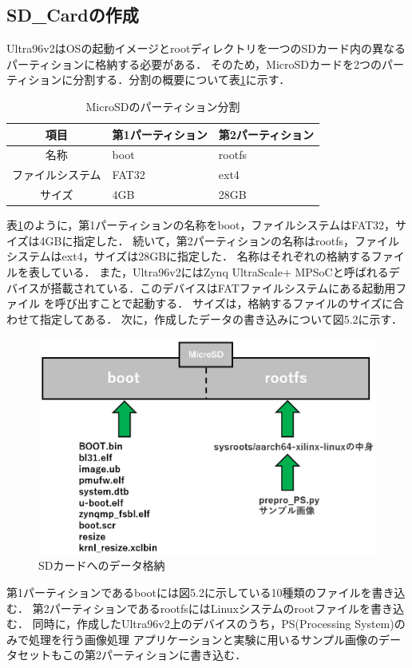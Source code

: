 \documentclass[11pt,a4j]{jreport}
\begin{document}
\subsection{SD_Cardの作成}
Ultra96v2はOSの起動イメージとrootディレクトリを一つのSDカード内の異なるパーティションに格納する必要がある．
そのため，MicroSDカードを2つのパーティションに分割する．分割の概要について表\ref{SDpartition}に示す．
\begin{table}[H]
  \caption{MicroSDのパーティション分割}
  \label{SDpartition}
  \centering
  \begin{tabular}{|c|l|l|}
    \hline
    項目 & 第1パーティション & 第2パーティション \\
    \hline \hline
    名称 & boot & rootfs \\
    ファイルシステム & FAT32 & ext4 \\
    サイズ & 4GB & 28GB \\
    \hline
    \end{tabular}
\end{table}
表\ref{SDpartition}のように，第1パーティションの名称をboot，ファイルシステムはFAT32，サイズは4GBに指定した．
続いて，第2パーティションの名称はrootfs，ファイルシステムはext4，サイズは28GBに指定した．
名称はそれぞれの格納するファイルを表している．
また，Ultra96v2にはZynq UltraScale+ MPSoCと呼ばれるデバイスが搭載されている．このデバイスはFATファイルシステムにある起動用ファイル
を呼び出すことで起動する．
サイズは，格納するファイルのサイズに合わせて指定してある．
次に，作成したデータの書き込みについて図5.2に示す．
\begin{figure}[H]
  \center
  \includegraphics[scale = 0.7]{pict/pict10.jpg}
  \caption{SDカードへのデータ格納}
\end{figure}
第1パーティションであるbootには図5.2に示している10種類のファイルを書き込む．
第2パーティションであるrootfsにはLinuxシステムのrootファイルを書き込む．
同時に，作成したUltra96v2上のデバイスのうち，PS(Processing System)のみで処理を行う画像処理
アプリケーションと実験に用いるサンプル画像のデータセットもこの第2パーティションに書き込む．
\end{document}
